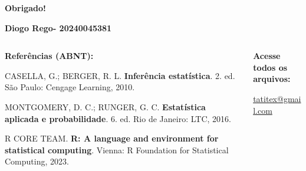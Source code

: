 \documentclass[aspectratio=169,12pt]{beamer}
\begin{document}
\begin{frame}
    \begin{center}
        \Huge \textcolor{azulescuro}{\textbf{Obrigado!}}
        
        \vspace{0.5cm}
        
        \Large \textcolor{azulprincipal}{\textbf{Diogo Rego- 20240045381}}
        
        \vspace{0,5cm}
        
        \begin{columns}
            \begin{column}{0.6\textwidth}
                \textbf{\large Referências (ABNT):}
                \vspace{0.2cm}
                
                \begin{flushleft}
                    \footnotesize
                    CASELLA, G.; BERGER, R. L. \textbf{Inferência estatística}. 2. ed. São Paulo: Cengage Learning, 2010.
                    
                    \vspace{0.2cm}
                    
                    MONTGOMERY, D. C.; RUNGER, G. C. \textbf{Estatística aplicada e probabilidade}. 6. ed. Rio de Janeiro: LTC, 2016.
                    
                    \vspace{0.2cm}
                    
                    R CORE TEAM. \textbf{R: A language and environment for statistical computing}. Vienna: R Foundation for Statistical Computing, 2023.
                \end{flushleft}
            \end{column}
            
            \begin{column}{0.3\textwidth}
                \begin{center}
                    \textbf{Acesse todos os arquivos:}
                    \vspace{0.3cm}
                    
                    
                    \vspace{0.3cm}
                    \footnotesize
                    \url{tatitex@gmail.com}
                \end{center}
            \end{column}
        \end{columns}
    \end{center}
\end{frame}
\end{document}
